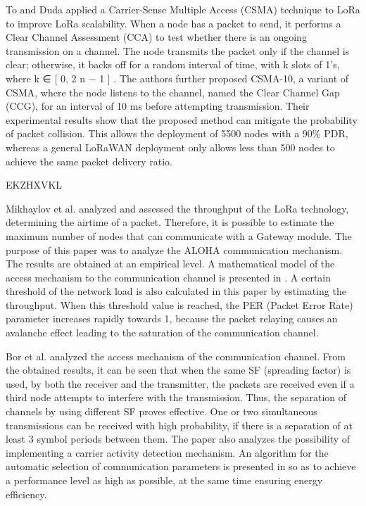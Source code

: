 To and Duda \cite{to_simulation_2018} applied a Carrier-Sense Multiple Access (CSMA) technique to LoRa to improve LoRa scalability.
When a node has a packet to send,
	it performs a Clear Channel Assessment (CCA) to test whether there is an ongoing transmission on a channel.
The node transmits the packet only if the channel is clear;
	otherwise,
	it backs off for a random interval of time,
	with k slots of 1’s,
	where k ∈ [ 0, 2 n − 1 ] .
The authors further proposed CSMA-10,
	a variant of CSMA,
	where the node listens to the channel,
	named the Clear Channel Gap (CCG),
	for an interval of 10 ms before attempting transmission.
Their experimental results show that the proposed method can mitigate the probability of packet collision.
This allows the deployment of 5500 nodes with a 90\% PDR,
whereas a general LoRaWAN deployment only allows less than 500 nodes to achieve the same packet delivery ratio.

\cite{lavric_performance_2018} EKZHXVKL


Mikhaylov et al.
\cite{mikhaylov_analysis_2016} analyzed and assessed the throughput of the LoRa technology,
	determining the airtime of a packet.
Therefore,
	it is possible to estimate the maximum number of nodes that can communicate with a Gateway module.
The purpose of this paper was to analyze the ALOHA communication mechanism.
The results are obtained at an empirical level.
A mathematical model of the access mechanism to the communication channel is presented in \cite{bankov_mathematical_2017}.
A certain threshold of the network load is also calculated in this paper by estimating the throughput.
When this threshold value is reached,
	the PER (Packet Error Rate) parameter increases rapidly towards 1,
	because the packet relaying causes an avalanche effect leading to the saturation of the communication channel.

Bor et al.
\cite{bor_lora_nodate} analyzed the access mechanism of the communication channel.
From the obtained results,
	it can be seen that when the same SF (spreading factor) is used,
	by both the receiver and the transmitter,
	the packets are received even if a third node attempts to interfere with the transmission.
Thus,
	the separation of channels by using different SF proves effective.
One or two simultaneous transmissions can be received with high probability,
	if there is a separation of at least 3 symbol periods between them.
The paper also analyzes the possibility of implementing a carrier activity detection mechanism.
An algorithm for the automatic selection of communication parameters is presented in \cite{bor_lora_2017} so as to achieve a performance level as high as possible,
	at the same time ensuring energy efficiency.

